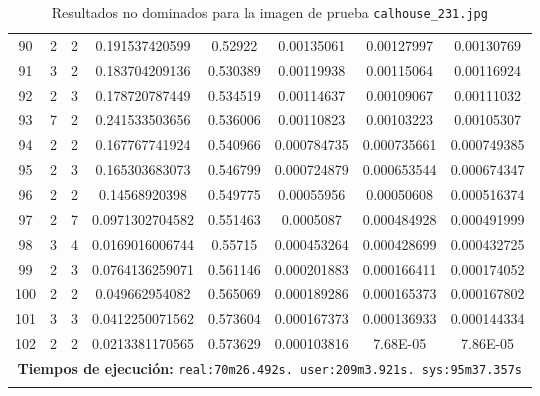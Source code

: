 \begin{longtable}{|c|c|c|c|c|c|c|c|}
90 & 2 & 2 & 0.191537420599 & 0.52922 & 0.00135061 & 0.00127997 & 0.00130769 \\
91 & 3 & 2 & 0.183704209136 & 0.530389 & 0.00119938 & 0.00115064 & 0.00116924 \\
92 & 2 & 3 & 0.178720787449 & 0.534519 & 0.00114637 & 0.00109067 & 0.00111032 \\
93 & 7 & 2 & 0.241533503656 & 0.536006 & 0.00110823 & 0.00103223 & 0.00105307 \\
94 & 2 & 2 & 0.167767741924 & 0.540966 & 0.000784735 & 0.000735661 & 0.000749385 \\
95 & 2 & 3 & 0.165303683073 & 0.546799 & 0.000724879 & 0.000653544 & 0.000674347 \\
96 & 2 & 2 & 0.14568920398 & 0.549775 & 0.00055956 & 0.00050608 & 0.000516374 \\
97 & 2 & 7 & 0.0971302704582 & 0.551463 & 0.0005087 & 0.000484928 & 0.000491999 \\
98 & 3 & 4 & 0.0169016006744 & 0.55715 & 0.000453264 & 0.000428699 & 0.000432725 \\
99 & 2 & 3 & 0.0764136259071 & 0.561146 & 0.000201883 & 0.000166411 & 0.000174052 \\
100 & 2 & 2 & 0.049662954082 & 0.565069 & 0.000189286 & 0.000165373 & 0.000167802 \\
101 & 3 & 3 & 0.0412250071562 & 0.573604 & 0.000167373 & 0.000136933 & 0.000144334 \\
102 & 2 & 2 & 0.0213381170565 & 0.573629 & 0.000103816 & 7.68E-05 & 7.86E-05 \\
\hline
\multicolumn{8}{|c|}{\textbf{Tiempos de ejecución:} \texttt{real:70m26.492s. user:209m3.921s. sys:95m37.357s}}\\  \hline
\caption{Resultados no dominados para la imagen de prueba \texttt{calhouse\_231.jpg}}
\label{tab:calhouse_231}
\end{longtable}
\normalsize

